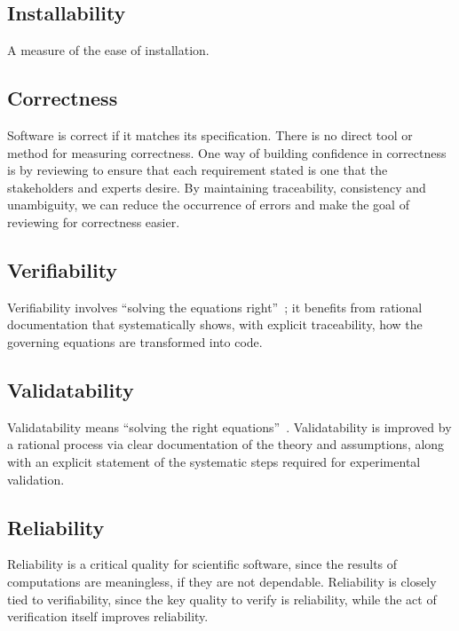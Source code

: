 \documentclass[12pt]{article}
\begin{document}
\subsection{Installability}

A measure of the ease of installation.


\subsection{Correctness}

Software is correct if it matches its specification.  There is no direct tool or
method for measuring correctness. One way of building confidence in correctness
is by reviewing to ensure that each requirement stated is one that the
stakeholders and experts desire.  By maintaining traceability, consistency and
unambiguity, we can reduce the occurrence of errors and make the goal of
reviewing for correctness easier.

\subsection{Verifiability}

Verifiability involves ``solving the equations right''~\cite[p.~23]{Roache1998};
it benefits from rational documentation that systematically shows, with explicit
traceability, how the governing equations are transformed into code.

\subsection{Validatability}

Validatability means ``solving the right equations''~\cite[p.~23]{Roache1998}.
Validatability is improved by a rational process via clear documentation of the
theory and assumptions, along with an explicit statement of the systematic steps
required for experimental validation.

\subsection{Reliability}

Reliability is a critical quality for scientific software, since the results of
computations are meaningless, if they are not dependable.  Reliability is
closely tied to verifiability, since the key quality to verify is reliability,
while the act of verification itself improves reliability.
\end{document}
